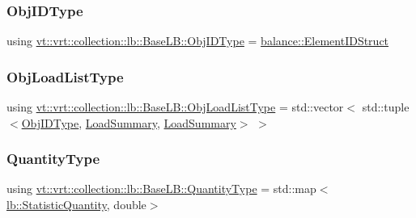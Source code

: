\subsubsection{\texorpdfstring{Obj\+I\+D\+Type}{ObjIDType}}
{\footnotesize\ttfamily using \hyperlink{structvt_1_1vrt_1_1collection_1_1lb_1_1_base_l_b_a790b22acf448880599724749cdc4e9b3}{vt\+::vrt\+::collection\+::lb\+::\+Base\+L\+B\+::\+Obj\+I\+D\+Type} =  \hyperlink{namespacevt_1_1vrt_1_1collection_1_1balance_a9f5b53fafb270212279a4757d2c4cd28}{balance\+::\+Element\+I\+D\+Struct}}

\mbox{\label{structvt_1_1vrt_1_1collection_1_1lb_1_1_base_l_b_ab19ea4bb93a63cd22645cc03a58651f1}} 
\subsubsection{\texorpdfstring{Obj\+Load\+List\+Type}{ObjLoadListType}}
{\footnotesize\ttfamily using \hyperlink{structvt_1_1vrt_1_1collection_1_1lb_1_1_base_l_b_ab19ea4bb93a63cd22645cc03a58651f1}{vt\+::vrt\+::collection\+::lb\+::\+Base\+L\+B\+::\+Obj\+Load\+List\+Type} =  std\+::vector$<$ std\+::tuple$<$\hyperlink{structvt_1_1vrt_1_1collection_1_1lb_1_1_base_l_b_a790b22acf448880599724749cdc4e9b3}{Obj\+I\+D\+Type}, \hyperlink{structvt_1_1vrt_1_1collection_1_1lb_1_1_base_l_b_aa78583f362acc50fcca87d4ce3150151}{Load\+Summary}, \hyperlink{structvt_1_1vrt_1_1collection_1_1lb_1_1_base_l_b_aa78583f362acc50fcca87d4ce3150151}{Load\+Summary}$>$ $>$}

\mbox{\label{structvt_1_1vrt_1_1collection_1_1lb_1_1_base_l_b_a864b2c437d81680577013741e265ef0d}} 
\subsubsection{\texorpdfstring{Quantity\+Type}{QuantityType}}
{\footnotesize\ttfamily using \hyperlink{structvt_1_1vrt_1_1collection_1_1lb_1_1_base_l_b_a864b2c437d81680577013741e265ef0d}{vt\+::vrt\+::collection\+::lb\+::\+Base\+L\+B\+::\+Quantity\+Type} =  std\+::map$<$\hyperlink{namespacevt_1_1vrt_1_1collection_1_1lb_a74989c7b4dd16fcc067e90a29cd1febe}{lb\+::\+Statistic\+Quantity}, double$>$}

